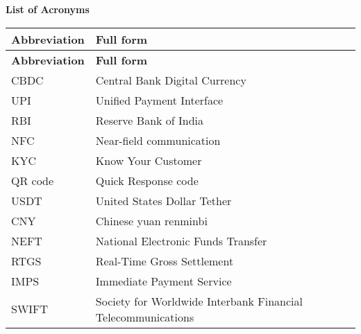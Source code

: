 \newpage

\thispagestyle{plain}

\noindent\textbf{\huge List of Acronyms}
\vspace{0.2cm}
\setlength{\tabcolsep}{4pt}
\vspace{-1em}
\addtolength\tabcolsep{.01pt}
\renewcommand{\arraystretch}{1.325}
\setlength{\LTcapwidth}{12in}

   \begin{longtable}{p{5cm} p{9cm}}
   \hline
   \textbf{Abbreviation}  & \textbf{Full form}\\
   \hline
   \endfirsthead
    \hline
   \textbf{Abbreviation}  & \textbf{Full form}\\
   \hline
    \endhead

    \hline
    \endfoot
    \hline
    \endlastfoot
CBDC    &Central Bank Digital Currency\\
UPI     &Unified Payment Interface\\
RBI     &Reserve Bank of India\\
NFC     &Near-field communication \\
KYC     &Know Your Customer \\
QR code     &Quick Response code\\
USDT        &United States Dollar Tether \\
CNY     &Chinese yuan renminbi \\
NEFT        &National Electronic Funds Transfer \\
RTGS        &Real-Time Gross Settlement \\
IMPS        &Immediate Payment Service \\ 
SWIFT   &Society for Worldwide Interbank Financial Telecommunications \\
\hline
\end{longtable}
